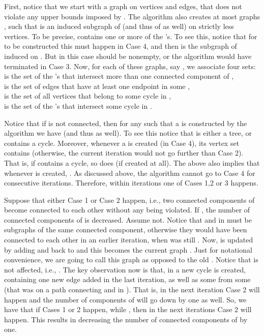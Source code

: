 \documentclass[12pt,a4paper]{article}
\theoremstyle{definition}
\theoremstyle{plain}
\newenvironment{prf}{\noindent {\bf Proof.}}{\begin{flushright}\vspace{-2em}\footnotesize\normalsize\end{flushright}\smallskip}
\begin{document}
\begin{prf}
First, notice that we start with a graph  
on  vertices and  edges, 
that does not violate any upper bounds imposed by . 
The algorithm also creates at most  graphs
, 
such that  is an induced subgraph of  
(and thus of  as well) on strictly
less vertices. 
To be precise,  contains one or more of the 
's. 
To see this, notice that for  to be constructed 
this must happen in Case 4, 
and then  is the subgraph of  induced on 
. 
But  in this case should be nonempty,
or the algorithm would have terminated in Case 3.
Now, for each of these graphs, say , we associate four sets: \\
 is the set of the 's that intersect 
more than one connected component of , \\
 is the set of edges that have at least one endpoint 
in some ,\\
 is the set of all vertices that belong to some cycle in ,\\
 is the set of the 's 
that intersect some cycle in .

Notice that if  is not connected, then for any  
such that a  is constructed by the algorithm
we have  
(and thus  
as well). 
To see this notice that  is either a tree, or contains a cycle.
Moreover, whenever a  is created (in Case 4),
its vertex set contains  
(otherwise, the current iteration would not go further than Case 2). 
That is, if 
contains a cycle, so does  (if created at all). 
The above also implies that whenever  is created, 
.
As discussed above, the algorithm cannot go to Case 4 for  
consecutive iterations.
Therefore, within  iterations one of Cases 1,2 or 3 happens. 

Suppose that either Case 1 or Case 2 happen,
i.e., two connected components 
of  become connected to each other without any  
being violated. 
If , the number of connected components of  is 
decreased. 
Assume not. 
Notice that  and  in  must be subgraphs of
the same connected component, 
otherwise they would have been connected 
to each other in an earlier iteration,
when  was still . 
Now,  is updated by adding  and 
back to  and this becomes the current graph . 
Just for notational convenience, we are going to call this graph 
 as opposed to the old . 
Notice that  is not affected, i.e.,
. 
The key observation now is that, in  a new cycle is created, 
containing 
one new edge added in the last iteration, 
as well as some  from some  
(that was on a path connecting  and  in ). 
That is, in the next iteration Case 2 will happen
and the number of components of  will go down by one as well.
So, we have that if Cases 1 or 2 happen, while , 
then in the next  iterations
Case 2 will happen. 
This results in decreasing the number 
of connected components of  by one. 


\end{prf}
\end{document}
